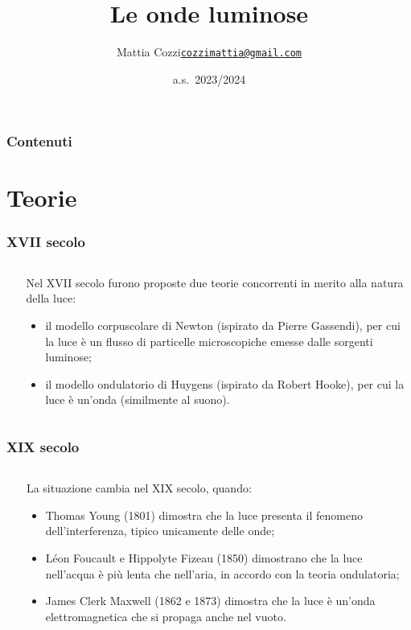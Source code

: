 \documentclass[]{beamer}
\title{Le onde luminose}
\author{\texorpdfstring{Mattia Cozzi\newline\href{mailto:cozzimattia@gmail.com}{\texttt{cozzimattia@gmail.com}}}{Mattia Cozzi}}
\date{a.s.~2023/2024}
\theoremstyle{plain}
\begin{document}
\begin{frame}
  \titlepage
\end{frame}





\begin{frame}
\frametitle{Contenuti}
\tableofcontents
\end{frame}


\section{Teorie}


\begin{frame}
\frametitle{XVII secolo}
\begin{columns}
\begin{column}{0.2\textwidth}
~
\end{column}
\begin{column}{0.7\textwidth}
Nel XVII secolo furono proposte due teorie concorrenti in merito alla natura della luce:
\begin{itemize}
\item<1-> il \alert<1>{modello corpuscolare} di Newton (ispirato da Pierre Gassendi), per cui la luce è un flusso di particelle microscopiche emesse dalle sorgenti luminose;\pause
\item<2-> il \alert<2>{modello ondulatorio} di Huygens (ispirato da Robert Hooke), per cui la luce è un'onda (similmente al suono).
\end{itemize}

\end{column}
\end{columns}
\end{frame}

\begin{frame}
\frametitle{XIX secolo}
\begin{columns}
\begin{column}{0.2\textwidth}
~
\end{column}
\begin{column}{0.7\textwidth}
La situazione cambia nel XIX secolo, quando:
\begin{itemize}
  \item<1-> Thomas Young (1801) dimostra che la luce presenta il \alert<1>{fenomeno dell'interferenza, tipico unicamente delle onde};
  \item<2-> Léon Foucault e Hippolyte Fizeau (1850) dimostrano che la luce nell'acqua è più lenta che nell'aria, \alert<2>{in accordo con la teoria ondulatoria};
  \item<3-> James Clerk Maxwell (1862 e 1873) dimostra che \alert<3>{la luce è un'onda elettromagnetica} che si propaga anche nel vuoto.
\end{itemize}

\end{column}
\end{columns}
\end{frame}
\end{document}
